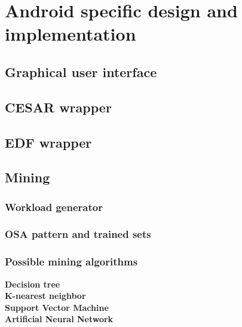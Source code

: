 \section{Android specific design and implementation}
\subsection{Graphical user interface}
\subsection{CESAR wrapper}
\subsection{EDF wrapper}
\subsection{Mining}
\subsubsection{Workload generator}
\subsubsection{OSA pattern and trained sets}
\subsubsection{Possible mining algorithms}
\textbf{Decision tree}\\
\textbf{K-nearest neighbor}\\
\textbf{Support Vector Machine}\\
\textbf{Artificial Neural Network}